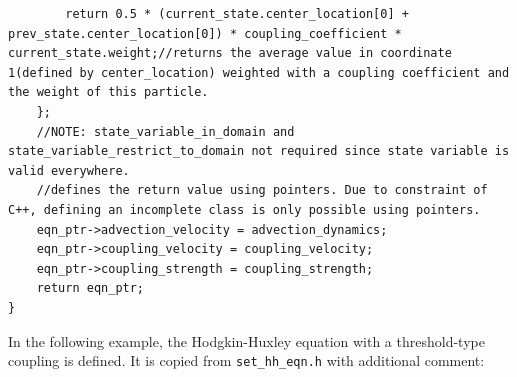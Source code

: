 \documentclass[10pt]{article} %
\begin{document}
\begin{lstlisting}
        return 0.5 * (current_state.center_location[0] + prev_state.center_location[0]) * coupling_coefficient * current_state.weight;//returns the average value in coordinate 1(defined by center_location) weighted with a coupling coefficient and the weight of this particle.
    };
    //NOTE: state_variable_in_domain and state_variable_restrict_to_domain not required since state variable is valid everywhere.
    //defines the return value using pointers. Due to constraint of C++, defining an incomplete class is only possible using pointers.
    eqn_ptr->advection_velocity = advection_dynamics;
    eqn_ptr->coupling_velocity = coupling_velocity;
    eqn_ptr->coupling_strength = coupling_strength;
    return eqn_ptr;
}
\end{lstlisting}
In the following example, the Hodgkin-Huxley equation with a threshold-type coupling is defined. It is copied from \texttt{set\_hh\_eqn.h} with additional comment:
\end{document}
